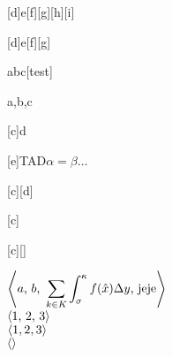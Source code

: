 \documentclass[../main.tex]{subfiles}
\begin{document}

\par\vspace{5mm}


\par\vspace{5mm}

[d]{e}[f][g][h][i] 

\par\vspace{5mm}

[d]{e}[f][g] 

\par\vspace{5mm}

\begin{Estructura}{abc}[test]
    \begin{Tupla}[test]
        a,b,c%
    \end{Tupla}
\end{Estructura}

\par\vspace{5mm}


\par\vspace{5mm}


\par\vspace{5mm}

[c]{d} 

\par\vspace{5mm}

[e]{TAD}{$\alpha = \beta\dots$} 

\par\vspace{5mm}

[c][d]  \par\vspace{5mm}
[c]     \par\vspace{5mm}
[c][]   \par\vspace{5mm}

\newpage

$\tupleOf{a}{b}{\displaystyle\sum_{k \in K}{\int_{\sigma}^{\kappa}{f(\hat{x})\Delta y}}}{\text{jeje}}$\\
$\tupleOf{1}{2}{3}$\\
$\tupleOf{1, 2, 3}$\\
$\tupleOf{}$\\
\end{document}
